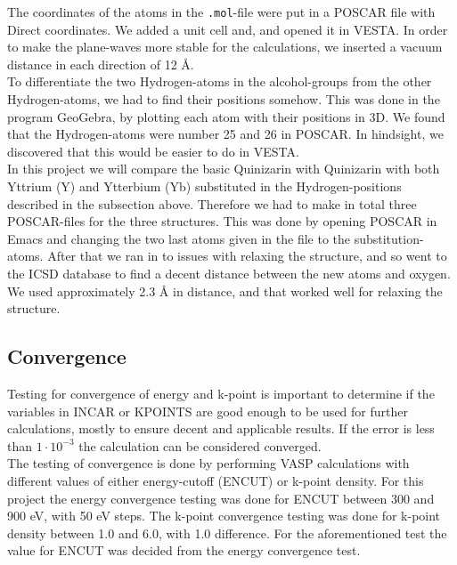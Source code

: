 \documentclass{article}
\begin{document}
  The coordinates of the atoms in the \texttt{.mol}-file were put in a POSCAR file with Direct coordinates. We added a unit cell and, and opened it in VESTA. In order to make the plane-waves more stable for the calculations, we inserted a vacuum distance in each direction of 12 Å. \\

  To differentiate the two Hydrogen-atoms in the alcohol-groups from the other Hydrogen-atoms, we had to find their positions somehow. This was done in the program GeoGebra, by plotting each atom with their positions in 3D. We found that the Hydrogen-atoms were number 25 and 26 in POSCAR. In hindsight, we discovered that this would be easier to do in VESTA. \\

  In this project we will compare the basic Quinizarin with Quinizarin with both Yttrium (Y) and Ytterbium (Yb) substituted in the Hydrogen-positions described in the subsection above. Therefore we had to make in total three POSCAR-files for the three structures. This was done by opening POSCAR in Emacs and changing the two last atoms given in the file to the substitution-atoms. After that we ran in to issues with relaxing the structure, and so went to the ICSD database to find a decent distance between the new atoms and oxygen. We used approximately 2.3 Å in distance, and that worked well for relaxing the structure. \\


  \subsection{Convergence}  \label{sec:Convergence}

    Testing for convergence of energy and k-point is important to determine if the variables in INCAR or KPOINTS are good enough to be used for further calculations, mostly to ensure decent and applicable results. If the error is less than $1\cdot 10^{-3}$ the calculation can be considered converged. \\

    The testing of convergence is done by performing VASP calculations with different values of either energy-cutoff (ENCUT) or k-point density. For this project the energy convergence testing was done for ENCUT between 300 and 900 eV, with 50 eV steps. The k-point convergence testing was done for k-point density between 1.0 and 6.0, with 1.0 difference. For the aforementioned test the value for ENCUT was decided from the energy convergence test. \\
\end{document}

